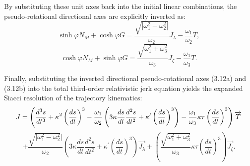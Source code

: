 \documentclass[reqno]{amsart}
\theoremstyle{plain}
\numberwithin{equation}{section}
\begin{document}
By substituting these unit axes back into the initial linear combinations, the pseudo-rotational directional axes are explicitly inverted as:
\begin{equation}
\sinh \varphi N_{M} + \cosh \varphi G = \frac{\sqrt{\left|\omega_{1}^{2} - \omega_{2}^{2}\right|}}{\omega_{2}} J_{\lambda} - \frac{\omega_{1}}{\omega_{2}} T, \tag{3.12a}
\end{equation}
\begin{equation}
\cosh \varphi N_{M} + \sinh \varphi G = \frac{\sqrt{\omega_{1}^{2} + \omega_{3}^{2}}}{\omega_{3}} J_{\zeta} - \frac{\omega_{1}}{\omega_{3}} T. \tag{3.12b}
\end{equation}

Finally, substituting the inverted directional pseudo-rotational axes (3.12a) and (3.12b) into the total third-order relativistic jerk equation yields the expanded Siacci resolution of the trajectory kinematics:
\begin{equation*}
J=\left( \frac{d^{3}s}{dt^{3}}+\kappa ^{2}\left( \frac{ds}{dt}\right) ^{3}-%
\frac{\omega _{1}}{\omega _{2}}\left( 3\kappa \frac{ds}{dt}\frac{d^{2}s}{%
dt^{2}}+\kappa ^{\prime }\left( \frac{ds}{dt}\right) ^{3}\right) -\frac{%
\omega _{1}}{\omega _{3}}\kappa \tau \left( \frac{ds}{dt}\right) ^{3}\right) 
\overrightarrow{T}
\end{equation*}%
\begin{equation}
+\frac{\sqrt{\vert\omega _{1}^{2}-\omega _{2}^{2}}\vert}{\omega _{2}}\left( 3\kappa 
\frac{ds}{dt}\frac{d^{2}s}{dt^{2}}+\kappa ^{\prime }\left( \frac{ds}{dt}%
\right) ^{3}\right) \overrightarrow{J_{\lambda }}+\left( \frac{\sqrt{\omega
_{1}^{2}+\omega _{3}^{2}}}{\omega _{3}}\kappa \tau \left( \frac{ds}{dt}%
\right) ^{3}\right) \overrightarrow{J_{\zeta }}.  \tag{3.13}
\end{equation}%
\end{document}
